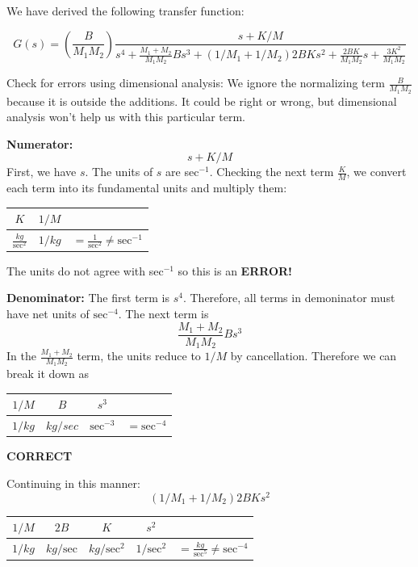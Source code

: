 \begin{Example}\label{DimensionalAnalysisExample}

We have derived the following transfer function:

\[
G(s) = \left( \frac {B} {M_1M_2}\right) \frac{s+K/M}
 {s^4 + \frac{M_1+M_2}{M_1M_2}Bs^3+(1/M_1+1/M_2)2BKs^2+\frac{2BK}{M_1M_2}s+\frac{3K^2}{M_1M_2}}
\]

Check for errors using dimensional analysis:
We  ignore the normalizing term $\frac{B}{M_1M_2}$ because it is outside the additions.  It could be right or wrong, but
dimensional analysis won't help us with this particular term.


{\bf Numerator:}
\[
s+K/M
\]
First, we have $s$.  The units of $s$ are sec$^{-1}$.  Checking the next term $\frac{K}{M}$, we convert each term into its fundamental units and multiply them:

\begin{tabular}{c|c|c}
$K$ 	&	$1/M$  &	\\ \hline
$\frac{kg}{\mathrm{sec}^2}$ & $1/kg$ & $= \frac{1}{\mathrm{sec}^2} \neq \mathrm{sec}^{-1}$ \\
\end{tabular}

The units do not agree with sec$^{-1}$ so this is an \hspace{0.25in}  {\bf ERROR!}


\vspace{0.15in}

{\bf Denominator: }
\vspace{0.2in}
The first term is $s^4$.  Therefore, all terms in demoninator must have net units of $\mathrm{sec}^{-4}$.  The next term is
\[
\frac{M_1+M_2}{M_1M_2}Bs^3
\]
In the $\frac{M_1+M_2}{M_1M_2}$ term, the units reduce to $1/M$ by cancellation.   Therefore we can break it down as

\begin{tabular}{c|c|c|c}
$1/M$	& $B$      & $s^3$ & \\ \hline
$1/kg$  & $kg/sec$ & $\mathrm{sec}^{-3}$ & $= \mathrm{sec}^{-4}$
\end{tabular}
\hspace{0.25in}  {\bf CORRECT}



Continuing in this manner:
\[
(1/M_1+1/M_2)2BKs^2
\]

\begin{tabular}{c|c|c|c|c}
$1/M$	& $2B$	& $K$	& $s^2$ & \\ \hline
$1/kg$  & $kg/\mathrm{sec}$	& $kg/\mathrm{sec}^2$	& $1/\mathrm{sec}^2$	& $= \frac{kg}{\mathrm{sec}^5} \neq \mathrm{sec}^{-4}$
\end{tabular}
\hspace{0.25in}{\bf ERROR!}



\end{Example}
